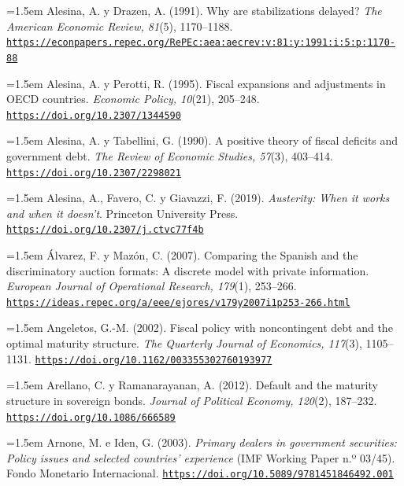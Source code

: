\documentclass[10pt,a4paper]{article}
\begin{document}
\noindent\hangindent=1.5em Alesina, A. y Drazen, A. (1991). Why are stabilizations delayed? \textit{The American Economic Review, 81}(5), 1170--1188. \href{https://econpapers.repec.org/RePEc:aea:aecrev:v:81:y:1991:i:5:p:1170-88}{\nolinkurl{https://econpapers.repec.org/RePEc:aea:aecrev:v:81:y:1991:i:5:p:1170-88}}

\noindent\hangindent=1.5em Alesina, A. y Perotti, R. (1995). Fiscal expansions and adjustments in OECD countries. \textit{Economic Policy, 10}(21), 205--248. \href{https://doi.org/10.2307/1344590}{\nolinkurl{https://doi.org/10.2307/1344590}}

\noindent\hangindent=1.5em Alesina, A. y Tabellini, G. (1990). A positive theory of fiscal deficits and government debt. \textit{The Review of Economic Studies, 57}(3), 403--414. \href{https://doi.org/10.2307/2298021}{\nolinkurl{https://doi.org/10.2307/2298021}}

\noindent\hangindent=1.5em Alesina, A., Favero, C. y Giavazzi, F. (2019). \textit{Austerity: When it works and when it doesn't}. Princeton University Press. \href{https://doi.org/10.2307/j.ctvc77f4b}{\nolinkurl{https://doi.org/10.2307/j.ctvc77f4b}}

\noindent\hangindent=1.5em Álvarez, F. y Mazón, C. (2007). Comparing the Spanish and the discriminatory auction formats: A discrete model with private information. \textit{European Journal of Operational Research, 179}(1), 253--266. \href{https://ideas.repec.org/a/eee/ejores/v179y2007i1p253-266.html}{\nolinkurl{https://ideas.repec.org/a/eee/ejores/v179y2007i1p253-266.html}}

\noindent\hangindent=1.5em Angeletos, G.-M. (2002). Fiscal policy with noncontingent debt and the optimal maturity structure. \textit{The Quarterly Journal of Economics, 117}(3), 1105--1131. \href{https://doi.org/10.1162/003355302760193977}{\nolinkurl{https://doi.org/10.1162/003355302760193977}}

\noindent\hangindent=1.5em Arellano, C. y Ramanarayanan, A. (2012). Default and the maturity structure in sovereign bonds. \textit{Journal of Political Economy, 120}(2), 187--232. \href{https://doi.org/10.1086/666589}{\nolinkurl{https://doi.org/10.1086/666589}}

\noindent\hangindent=1.5em Arnone, M. e Iden, G. (2003). \textit{Primary dealers in government securities: Policy issues and selected countries' experience} (IMF Working Paper n.º 03/45). Fondo Monetario Internacional. \href{https://doi.org/10.5089/9781451846492.001}{\nolinkurl{https://doi.org/10.5089/9781451846492.001}}
\end{document}
